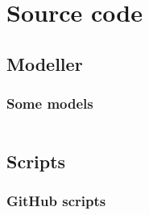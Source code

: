\chapter{Source code}
\label{appendix:sourcecode}

\section{Modeller}

\subsection{Some models}
\label{subsection:user-model}

\inputminted{csharp}{codefiles/models/Guest.cs}
\label{minted:application-user}

\section{Scripts}

\subsection{GitHub scripts}
\label{appendix:github-scripts}

\inputminted{yaml}{codefiles/build.yml}
\label{minted:build-yml}